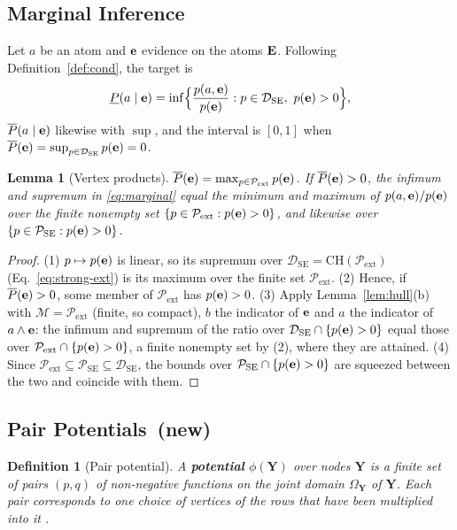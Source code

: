 \documentclass{article} %
\DeclareRobustCommand{\rev}[1]{{\color{blue}#1}}
\newcommand{\newtag}{\texorpdfstring{~\rev{(new)}}{}}
\newtheorem{definition}{Definition}
\newtheorem{lemma}{Lemma}
\newcommand{\DSE}{\mathcal{D}_{\mathrm{SE}}}
\begin{document}
\subsection{Marginal Inference}

Let $a$ be an atom and $\mathbf{e}$ evidence on the atoms $\mathbf{E}$. Following
Definition~\ref{def:cond}, the target is
\begin{equation}\label{eq:marginal}
  \underline{P}(a \mid \be) = \inf\Bigl\{\frac{p(a,\be)}{p(\be)} : p\in\DSE,\ p(\be)>0\Bigr\},
\end{equation}
$\overline{P}(a\mid\mathbf{e})$ likewise with $\sup$, and the interval is $[0,1]$ when
$\overline P(\be)=\sup_{p\in\DSE}p(\be)=0$.

\begin{lemma}[Vertex products]\label{lem:vertexprod}
$\overline P(\mathbf{e})=\max_{p\in\mathcal P_{\mathrm{ext}}}p(\mathbf{e})$. If $\overline P(\mathbf{e})>0$, the
infimum and supremum in \eqref{eq:marginal} equal the minimum and maximum of
$p(a,\mathbf{e})/p(\mathbf{e})$ over the finite nonempty set
$\{p\in\mathcal P_{\mathrm{ext}}:p(\mathbf{e})>0\}$, and likewise over
$\{p\in\mathcal P_{\mathrm{SE}}:p(\mathbf{e})>0\}$.
\end{lemma}

\begin{proof}
(1) $p\mapsto p(\mathbf{e})$ is linear, so its supremum over $\DSE=\mathrm{CH}(\mathcal
P_{\mathrm{ext}})$ (Eq.~\ref{eq:strong-ext}) is its maximum over the finite set
$\mathcal P_{\mathrm{ext}}$. (2) Hence, if $\overline P(\mathbf{e})>0$, some member of
$\mathcal P_{\mathrm{ext}}$ has $p(\mathbf{e})>0$. (3) Apply Lemma~\ref{lem:hull}(b) with
$\mathcal M=\mathcal P_{\mathrm{ext}}$ (finite, so compact), $b$ the indicator of $\mathbf{e}$ and
$a$ the indicator of $a\wedge\mathbf{e}$: the infimum and supremum of the ratio over
$\DSE\cap\{p(\be)>0\}$ equal those over $\mathcal P_{\mathrm{ext}}\cap\{p(\mathbf{e})>0\}$, a finite
nonempty set by (2), where they are attained. (4) Since $\mathcal P_{\mathrm{ext}}\subseteq
\mathcal P_{\mathrm{SE}}\subseteq\DSE$, the bounds over $\mathcal P_{\mathrm{SE}}\cap
\{p(\mathbf{e})>0\}$ are squeezed between the two and coincide with them.
\end{proof}

\subsection{Pair Potentials\newtag}

\begin{definition}[Pair potential]
A \textbf{potential} $\phi(\mathbf{Y})$ over nodes $\mathbf{Y}$ is a finite set
of pairs $(p,q)$ of non-negative functions on the joint domain $\Omega_{\mathbf Y}$ of
$\mathbf{Y}$. Each pair corresponds to one choice of vertices of the rows that have been
multiplied into it \citep{maua2012ijar,maua2020ijar}.
\end{definition}
\end{document}
